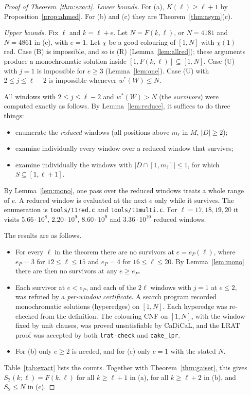 \documentclass[11pt]{amsart}
\theoremstyle{definition}
\newcommand{\F}{F}
\newcommand{\Stwo}{S_2}
\begin{document}
\begin{proof}[Proof of Theorem~\ref{thm:exact}]
\emph{Lower bounds.} For (a), $K(\ell)\ge\ell+1$ by Proposition~\ref{prop:ahmed}. For (b) and (c) they are Theorem~\ref{thm:asym}(c).

\emph{Upper bounds.} Fix $\ell$ and $k=\ell+e$. Let $N=\F(k,\ell)$, or $N=4181$ and $N=4861$ in (c), with $e=1$. Let $\chi$ be a good colouring of $[1,N]$ with $\chi(1)$ red. Case (B) is impossible, and so is (R) (Lemma~\ref{lem:allred}); these arguments produce a monochromatic solution inside $[1,\F(k,\ell)]\subseteq[1,N]$. Case (U) with $j=1$ is impossible for $e\ge3$ (Lemma~\ref{lem:one}). Case (U) with $2\le j\le\ell-2$ is impossible whenever $w^*(W)\le N$.

All windows with $2\le j\le\ell-2$ and $w^*(W)>N$ (the \emph{survivors}) were computed exactly as follows. By Lemma~\ref{lem:reduce}, it suffices to do three things:
\begin{itemize}
\item enumerate the \emph{reduced} windows (all positions above $m_\ell$ in $M$, $|D|\ge2$);
\item examine individually every window over a reduced window that survives;
\item examine individually the windows with $|D\cap[1,m_\ell]|\le1$, for which $S\subseteq[1,\ell+1]$.
\end{itemize}
By Lemma~\ref{lem:mono}, one pass over the reduced windows treats a whole range of $e$. A reduced window is evaluated at the next $e$ only while it survives. The enumeration is \texttt{tools/t1red.c} and \texttt{tools/t1multi.c}. For $\ell=17,18,19,20$ it visits $5.66\cdot10^8$, $2.20\cdot10^9$, $8.60\cdot10^9$ and $3.36\cdot10^{10}$ reduced windows.

The results are as follows.
\begin{itemize}
\item For every $\ell$ in the theorem there are no survivors at $e=e_P(\ell)$, where $e_P=3$ for $12\le\ell\le15$ and $e_P=4$ for $16\le\ell\le20$. By Lemma~\ref{lem:mono} there are then no survivors at any $e\ge e_P$.
\item Each survivor at $e<e_P$, and each of the $2\ell$ windows with $j=1$ at $e\le2$, was refuted by a \emph{per-window certificate}. A search program recorded monochromatic solutions (hyperedges) on $[1,N]$. Each hyperedge was re-checked from the definition. The colouring CNF on $[1,N]$, with the window fixed by unit clauses, was proved unsatisfiable by CaDiCaL, and the LRAT proof was accepted by both \texttt{lrat-check} and \texttt{cake\_lpr}.
\item For (b) only $e\ge2$ is needed, and for (c) only $e=1$ with the stated $N$.
\end{itemize}
Table~\ref{tab:exact} lists the counts. Together with Theorem~\ref{thm:gaiser}, this gives $\Stwo(k;\ell)=\F(k,\ell)$ for all $k\ge\ell+1$ in (a), for all $k\ge\ell+2$ in (b), and $\Stwo\le N$ in (c).
\end{proof}
\end{document}
